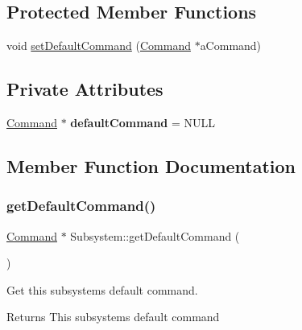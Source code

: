 \subsection*{Protected Member Functions}
\begin{DoxyCompactItemize}
\item 
void \mbox{\hyperlink{classlib_iterative_robot_1_1_subsystem_a6fff5c5756245ac750c2b26ee0ed2be7}{set\+Default\+Command}} (\mbox{\hyperlink{classlib_iterative_robot_1_1_command}{Command}} $\ast$a\+Command)
\end{DoxyCompactItemize}
\subsection*{Private Attributes}
\begin{DoxyCompactItemize}
\item 
\mbox{\label{classlib_iterative_robot_1_1_subsystem_a1a98d727550c3a59b6a852b3ec7277cb}} 
\mbox{\hyperlink{classlib_iterative_robot_1_1_command}{Command}} $\ast$ {\bfseries default\+Command} = N\+U\+LL
\end{DoxyCompactItemize}


\subsection{Member Function Documentation}
\mbox{\label{classlib_iterative_robot_1_1_subsystem_a7e0c4904d9ff8ad2e4b6bc98d0f9579f}} 
\subsubsection{\texorpdfstring{getDefaultCommand()}{getDefaultCommand()}}
{\footnotesize\ttfamily \mbox{\hyperlink{classlib_iterative_robot_1_1_command}{Command}} $\ast$ Subsystem\+::get\+Default\+Command (\begin{DoxyParamCaption}{ }\end{DoxyParamCaption})}

Get this subsystem\textquotesingle{}s default command.

\begin{DoxyReturn}{Returns}
This subsystem\textquotesingle{}s default command 
\end{DoxyReturn}
\mbox{\label{classlib_iterative_robot_1_1_subsystem_a30bd6c33c84c896f31ed01c8331aab57}} 

